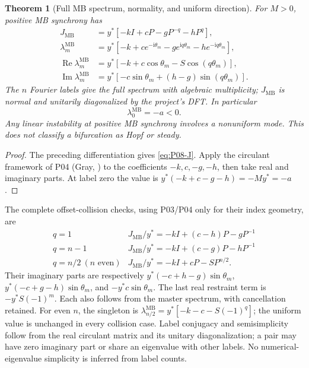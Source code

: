 \documentclass[11pt]{article}
\newcommand{\ii}{\mathrm{i}}
\newcommand{\MB}{\mathrm{MB}}
\DeclareMathOperator{\Ree}{Re}
\DeclareMathOperator{\Imm}{Im}
\newtheorem{theorem}{Theorem}[section]
\theoremstyle{definition}
\theoremstyle{remark}
\begin{document}
\begin{theorem}[Full MB spectrum, normality, and uniform direction]
\label{thm:P08-spectrum}
For $M>0$, positive MB synchrony has
\begin{align}
 J_{\MB}&=y^*[-kI+cP-gP^{-q}-hP^q],\label{eq:P08-J}\\
 \lambda_m^{\MB}&=y^*[-k+ce^{-\ii\theta_m}-ge^{\ii q\theta_m}
                           -he^{-\ii q\theta_m}],\label{eq:P08-spectrum}\\
 \Ree\lambda_m^{\MB}&=y^*[-k+c\cos\theta_m-S\cos(q\theta_m)],
 \label{eq:P08-real}\\
 \Imm\lambda_m^{\MB}&=y^*[-c\sin\theta_m+(h-g)\sin(q\theta_m)].
 \label{eq:P08-imag}
\end{align}
The $n$ Fourier labels give the full spectrum with algebraic multiplicity;
$J_{\MB}$ is normal and unitarily diagonalized by the project's DFT.
In particular
\begin{equation}
 \boxed{\lambda_0^{\MB}=-a<0.}\label{eq:P08-uniform}
\end{equation}
Any linear instability at positive MB synchrony involves a nonuniform
mode. This does not classify a bifurcation as Hopf or steady.
\end{theorem}
\begin{proof}
The preceding differentiation gives \eqref{eq:P08-J}. Apply the
circulant framework of P04 (Gray, \cite[Theorem~3.1]{Gray2006})
to the coefficients $-k,c,-g,-h$, then take real and imaginary parts.
At label zero the value is $y^*(-k+c-g-h)=-My^*=-a$.
\end{proof}

The complete offset-collision checks, using P03/P04 only for their
index geometry, are
\[
\begin{array}{c|l}
q=1&J_{\MB}/y^*=-kI+(c-h)P-gP^{-1}\\
q=n-1&J_{\MB}/y^*=-kI+(c-g)P-hP^{-1}\\
q=n/2\ (n\text{ even})&J_{\MB}/y^*=-kI+cP-SP^{n/2}.
\end{array}
\]
Their imaginary parts are respectively
$y^*(-c+h-g)\sin\theta_m$, $y^*(-c+g-h)\sin\theta_m$, and
$-y^*c\sin\theta_m$. The last real restraint term is $-y^*S(-1)^m$.
Each also follows from the master spectrum, with cancellation retained.
For even $n$, the singleton is
$\lambda_{n/2}^{\MB}=y^*[-k-c-S(-1)^q]$; the uniform value is
unchanged in every collision case. Label conjugacy and semisimplicity
follow from the real circulant matrix and its unitary diagonalization;
a pair may have zero imaginary part or share an eigenvalue with other
labels. No numerical-eigenvalue simplicity is inferred from label counts.
\end{document}
